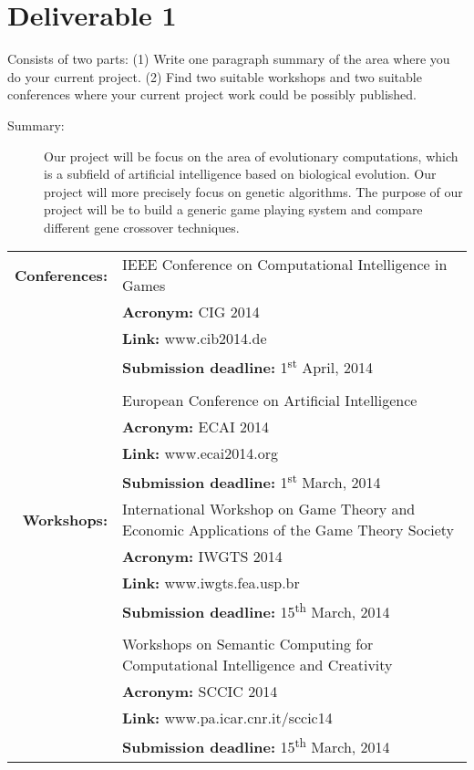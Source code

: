 \section{Deliverable 1}

Consists of two parts: (1) Write one paragraph summary of the area where you do
your current project. (2) Find two suitable workshops and two suitable
conferences where your current project work could be possibly published.

\begin{description}
	\item [Summary:] Our project will be focus on the area of evolutionary
		computations, which is a subfield of artificial intelligence
		based on biological evolution. Our project will more precisely
		focus on genetic algorithms. The purpose of our project will be
		to build a generic game playing system and compare different
		gene crossover techniques.
\end{description}

\begin{tabular}{r p{}}
  \textbf{Conferences:} & IEEE Conference on Computational Intelligence in Games \\
                        & \textbf{Acronym:} CIG 2014 \\	
                        & \textbf{Link:} www.cib2014.de \\
                        & \textbf{Submission deadline:} 1\textsuperscript{st} April, 2014 \\
	                & \\
	                & European Conference on Artificial Intelligence \\
                        & \textbf{Acronym:} ECAI 2014 \\	
                        & \textbf{Link:} www.ecai2014.org \\
                        & \textbf{Submission deadline:} 1\textsuperscript{st} March, 2014 \\
  \textbf{Workshops:}   & International Workshop on Game Theory and Economic
	Applications of the Game Theory Society \\
                        & \textbf{Acronym:} IWGTS 2014 \\	
                        & \textbf{Link:} www.iwgts.fea.usp.br\\
                        & \textbf{Submission deadline:} 15\textsuperscript{th} March, 2014 \\
	                & \\
		        & Workshops on Semantic Computing for Computational Intelligence and Creativity \\
                        & \textbf{Acronym:} SCCIC 2014 \\	
			& \textbf{Link:} www.pa.icar.cnr.it/sccic14 \\
                        & \textbf{Submission deadline:} 15\textsuperscript{th} March, 2014 \\
\end{tabular}

